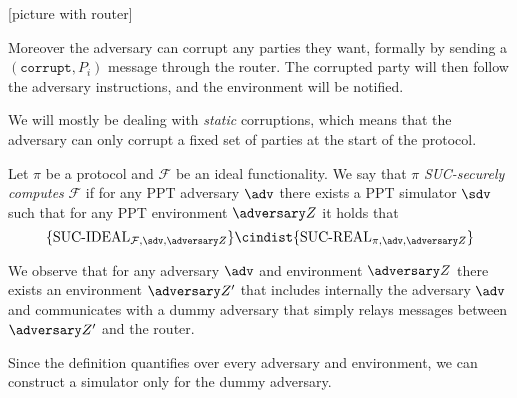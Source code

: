 [picture with router]

Moreover the adversary can corrupt any parties they want, formally by sending a $(\texttt{corrupt}, P_i)$ message through the router. The corrupted party will then follow the adversary instructions, and the environment will be notified.

We will mostly be dealing with \emph{static} corruptions, which means that the adversary can only corrupt a fixed set of parties at the start of the protocol.

\begin{definition}
    Let $\pi$ be a protocol and $\mathcal F$ be an ideal functionality. We say that $\pi$ \emph{SUC-securely computes} $\mathcal F$ if for any PPT adversary $\adv$ there exists a PPT simulator $\sdv$ such that for any PPT environment $\zdv$ it holds that
    $$ \{ \text{SUC-IDEAL}_{\Fun, \sdv, \zdv} \} \cindist \{ \text{SUC-REAL}_{\pi, \adv, \zdv} \}$$
\end{definition}

We observe that for any adversary $\adv$ and environment $\zdv$ there exists an environment $\zdv'$ that includes internally the adversary $\adv$ and communicates with a dummy adversary that simply relays messages between $\zdv'$ and the router.

Since the definition quantifies over every adversary and environment, we can construct a simulator only for the dummy adversary.

